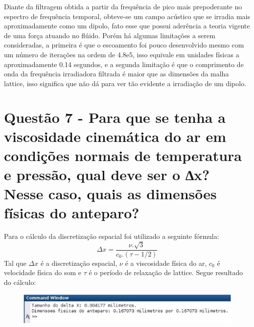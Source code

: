 Diante da filtragem obtida a partir da frequência de pico mais prepoderante no espectro de frequência temporal, obteve-se um campo acústico que se irradia mais aproximadamente como um dipolo, fato esse que possui aderência a teoria vigente de uma força atuando no flúido. Porém há algumas limitações a serem consideradas, a primeira é que o escoamento foi pouco desenvolvido mesmo com um número de iterações na ordem de 4.8e5, isso equivale em unidades físicas a aproximadamente 0.14 segundos, e a segunda limitação é que o comprimento de onda da frequência irradiadora filtrada é maior que as dimensões da malha lattice, isso significa que não dá para ver tão evidente a irradiação de um dipolo.


\section{Questão 7 - Para que se tenha a viscosidade cinemática do ar em condições normais de temperatura e pressão, qual deve ser o ∆x? Nesse caso, quais as dimensões físicas do anteparo?}

Para o cálculo da discretização espacial foi utilizado a seguinte fórmula:
\begin{equation}
    \Delta{x} = \frac{\nu.\sqrt{3}}{c_0.(\tau - 1/2)}
\end{equation}
Tal que $\Delta{x}$ é a discretização espacial, $\nu$ é a viscosidade física do ar, $c_0$ é velocidade física do som e $\tau$ é o período de relaxação de lattice. Segue resultado do cálculo:
\begin{figure}[h!]
    \centering
    \hspace{-1.cm}
    \includegraphics[width=1\textwidth]{resultado_calculo.eps}
\end{figure}




